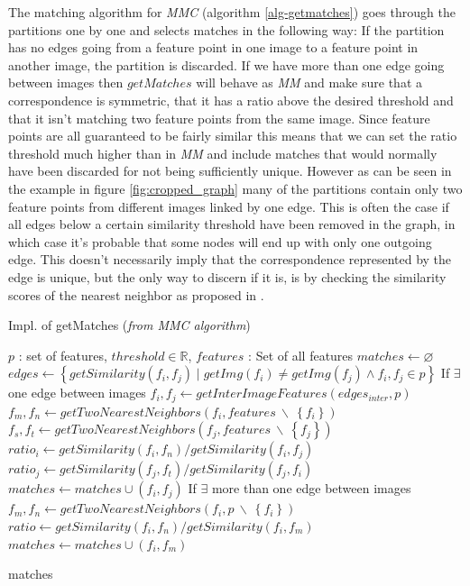 \documentclass{article}
\begin{document}
The matching algorithm for \emph{MMC} (algorithm \ref{alg-getmatches}) 
goes through the partitions one by one and selects matches in the 
following way: If the partition has no edges going from a feature point 
in one image to a feature point in another image, the partition is 
discarded. If we have more than one edge going between images then 
$getMatches$ will behave as \emph{MM} and make sure that a 
correspondence is symmetric, that it has a ratio above the desired 
threshold and that it isn't matching two feature points from the same 
image. Since feature points are all guaranteed to be fairly similar this 
means that we can set the ratio threshold much higher than in \emph{MM} 
and include matches that would normally have been discarded for not 
being sufficiently unique.
However as can be seen in the example in figure \ref{fig:cropped_graph} 
many of the partitions contain only two feature points from different 
images linked by one edge. This is often the case if all edges below a 
certain similarity threshold have been removed in the graph, in which 
case it's probable that some nodes will end up with only one outgoing 
edge. This doesn't necessarily imply that the correspondence represented 
by the edge is unique, but the only way to discern if it is, is by 
checking the similarity scores of the nearest neighbor as proposed in 
\cite{lowe2004sift}.

\begin{algorithm}
\caption{Impl. of getMatches (\emph{from MMC algorithm})}
\label{alg-getmatches}
\begin{algorithmic}
\Require $p$ : set of features, $threshold \in \mathbb{R}$, $features$ : 
Set of all features
\State $matches \gets \varnothing$
\State $edges \gets \left\{getSimilarity(f_i, f_j) \mid getImg(f_i) \neq 
getImg(f_j) \wedge f_i, f_j \in p \right\}$
 \Comment If $\exists$ one edge 
between images
	\State $f_i,f_j \gets getInterImageFeatures(edges_{inter}, p)$
	\State $f_m,f_n \gets getTwoNearestNeighbors(f_i, features ~ 
\backslash ~ \left\{f_i\right\})$
	\State $f_s,f_t \gets getTwoNearestNeighbors(f_j, features ~ 
\backslash ~ \left\{f_j\right\})$
	\State $ratio_i \gets getSimilarity(f_i, f_n) / getSimilarity(f_i, 
f_j)$
	\State $ratio_j \gets getSimilarity(f_j, f_t) / getSimilarity(f_j, 
f_i)$
		\State $matches \gets matches \cup (f_i, f_j)$
	\EndIf
{} \Comment If $\exists$ more 
than one edge between images
		\State $f_m,f_n \gets getTwoNearestNeighbors(f_i, p ~ \backslash 
~ \left\{f_i\right\})$
		\State $ratio \gets getSimilarity(f_i, f_n) / getSimilarity(f_i, 
f_m)$
			\State $matches \gets matches \cup (f_i, f_m)$
		\EndIf
	\EndFor
\EndIf

\Return matches
\end{algorithmic}
\end{algorithm}
\end{document}
